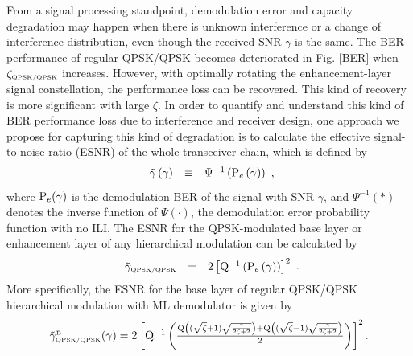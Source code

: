\documentclass[conference]{IEEEtran}
\begin{document}
From a signal processing standpoint, demodulation error and
capacity degradation may happen when there is unknown interference
or a change of interference distribution, even though the received
SNR $\gamma$ is the same. The BER performance of regular QPSK/QPSK
becomes deteriorated in Fig. \ref{BER} when $\zeta_{\mbox{\tiny
QPSK/QPSK}}$ increases. However, with optimally rotating the
enhancement-layer signal constellation, the performance loss can
be recovered. This kind of recovery is more significant with large
$\zeta$. In order to quantify and understand this kind of BER
performance loss due to interference and receiver design, one
approach we propose for capturing this kind of degradation is to
calculate the effective signal-to-noise ratio (ESNR) of the whole
transceiver chain, which is defined by
\begin{equation}
\begin{array}{rcl}
\tilde{\gamma}\left(\gamma\right)&\equiv&\Psi^{-1}\left({\rm
P}_{e}\left(\gamma\right)\right)
\end{array},\label{eff_SNR}
\end{equation}
\noindent where ${\rm P}_{e}(\gamma)$ is the demodulation BER of
the signal with SNR $\gamma$, and $\Psi^{-1}\left(\ast\right)$
denotes the inverse function of $\Psi\left(\cdot\right)$, the
demodulation error probability function with no ILI. The ESNR for
the QPSK-modulated base layer or enhancement layer of any
hierarchical modulation can be calculated by
\begin{equation}
\begin{array}{rcl}
\tilde{\gamma}_{\mbox{\tiny QPSK/QPSK}}&=&2\left[{\rm
Q}^{-1}\left({\rm P}_{e}\left(\gamma\right)\right)\right]^2
\end{array}.\label{eff_SNR_QPSK}
\end{equation}
\noindent More specifically, the ESNR for the base layer of
regular QPSK/QPSK hierarchical modulation with ML demodulator is
given by
\begin{equation}\hspace{-0.00in}
\begin{array}{l}
\tilde{\gamma}_{\mbox{\tiny QPSK/QPSK}}^{\mbox{\tiny
B}}(\gamma)=2\left[{\rm Q}^{-1}\left(\frac{{\rm
Q}\left((\sqrt{\zeta}+1)\sqrt{\frac{\gamma}{2\zeta+2}}\right)+{\rm
Q}\left((\sqrt{\zeta}-1)\sqrt{\frac{\gamma}{2\zeta+2}}\right)}{2}\right)\right]^2.
\end{array}\label{eff_SNR_QPSK_QPSK}
\end{equation}
\end{document}
